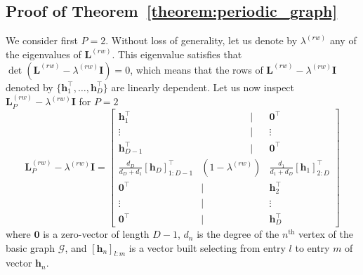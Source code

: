 \documentclass[a4paper,12pt,openany]{book}
\newcommand{\I}{\mathbf{I}}
\renewcommand{\L}{\mathbf{L}}
\newcommand{\h}{\mathbf{h}}
\begin{document}
\begin{appendices}
\section{Proof of Theorem~\ref{theorem:periodic_graph}}
\label{app:proof_periodic_theorem}

We consider first $P = 2$. Without loss of generality, let us denote by $\lambda^{(rw)}$ any of the eigenvalues of $\L^{(rw)}$. This eigenvalue satisfies that $\det(\L^{(rw)}-\lambda^{(rw)}\I)=0$, which means that the rows of $\L^{(rw)}-\lambda^{(rw)}\I$ denoted by $\{\h_1^\top,\ldots,\h_D^\top\}$ are linearly dependent. Let us now inspect $\L_P^{(rw)}-\lambda^{(rw)}\I$ for $P = 2$
\begin{equation}
	\label{eq:Lrw_P}
	\L_P^{(rw)}-\lambda^{(rw)}\I = \left [
	\begin{array}{ccc}
		\h_1^\top & \qquad\qquad\quad| & \mathbf{0}^\top \\
		\vdots & \qquad\qquad\quad| & \vdots \\
		\h_{D-1}^\top & \qquad\qquad\quad| & \mathbf{0}^\top \\
		\frac{d_D}{d_D+d_1}[\h_D]_{1:D-1}^\top & (1-\lambda^{(rw)}) & \frac{d_1}{d_1+d_D}[\h_1]_{2:D}^\top \\
		\mathbf{0}^\top & |\qquad\qquad\quad & \h_2^\top \\
		\vdots & |\qquad\qquad\quad & \vdots \\
		\mathbf{0}^\top & |\qquad\qquad\quad & \h_D^\top
	\end{array}
	\right ]
\end{equation}
where $\mathbf{0}$ is a zero-vector of length $D - 1$, $d_n$ is the degree of the $n^\text{th}$ vertex of the basic graph $\mathcal{G}$, and $[\h_n]_{l:m}$ is a vector built selecting from entry $l$ to entry $m$ of vector $\h_n$.


\end{appendices}
\end{document}
